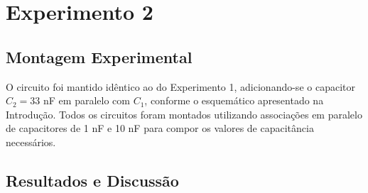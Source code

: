 \documentclass[a4paper,oneside,10pt]{article}
\begin{document}
\section{Experimento 2}

\subsection{Montagem Experimental}

O circuito foi mantido idêntico ao do Experimento 1, adicionando-se o capacitor $C_2 = 33$ nF em paralelo com $C_1$, conforme o esquemático apresentado na Introdução. Todos os circuitos foram montados utilizando associações em paralelo de capacitores de 1 nF e 10 nF para compor os valores de capacitância necessários.

\subsection{Resultados e Discussão}
\end{document}
